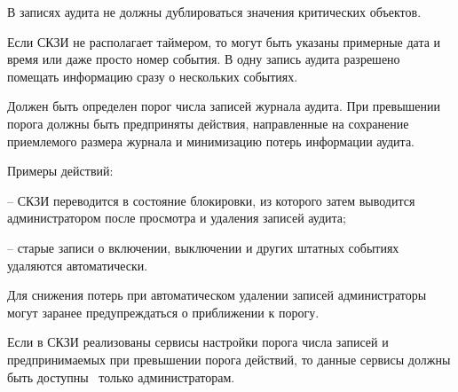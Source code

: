 В записях аудита не должны дублироваться значения критических объектов.

\begin{note}
Если СКЗИ не располагает таймером, то могут быть указаны примерные дата и время
или даже просто номер события.
%
В одну запись аудита разрешено помещать информацию сразу о нескольких событиях. 
\end{note}


\label{R.AU.Over} %
Должен быть определен порог числа записей журнала аудита.
При превышении порога должны быть предприняты действия,
направленные на сохранение приемлемого размера журнала
и минимизацию потерь информации аудита.

\begin{note}
Примеры действий:

-- СКЗИ переводится в состояние блокировки, из которого затем выводится
администратором после просмотра и удаления записей аудита;

-- старые записи о включении, выключении и других штатных событиях удаляются 
автоматически. 

Для снижения потерь при автоматическом удалении записей 
администраторы могут заранее предупреждаться о приближении к порогу.
\end{note}

\label{R.AU.Settings} %
Если в СКЗИ реализованы сервисы настройки порога числа записей и 
предпринимаемых при превышении порога действий, то данные сервисы должны 
быть доступны~ только администраторам. 

